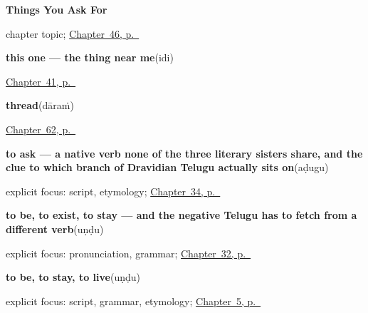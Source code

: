 \noindent\begin{minipage}[t]{\linewidth}
\raggedright
\textbf{Things You Ask For}\par
\footnotesize chapter topic; \hyperref[ch:te-ask-for]{Chapter~46, p.~\pageref*{ch:te-ask-for}}
\end{minipage}\par\smallskip

\noindent\begin{minipage}[t]{\linewidth}
\raggedright
\textbf{this one — the thing near me}\enspace\emph{}\enspace(idi)\par
\footnotesize \hyperref[ch:te-pointing-and-asking]{Chapter~41, p.~\pageref*{ch:te-pointing-and-asking}}
\end{minipage}\par\smallskip

\noindent\begin{minipage}[t]{\linewidth}
\raggedright
\textbf{thread}\enspace\emph{}\enspace(dāraṁ)\par
\footnotesize \hyperref[ch:te-made-things]{Chapter~62, p.~\pageref*{ch:te-made-things}}
\end{minipage}\par\smallskip

\noindent\begin{minipage}[t]{\linewidth}
\raggedright
\textbf{to ask — a native verb none of the three literary sisters share, and the clue to which branch of Dravidian Telugu actually sits on}\enspace\emph{}\enspace(aḍugu)\par
\footnotesize explicit focus: script, etymology; \hyperref[ch:te-verbs-between-people]{Chapter~34, p.~\pageref*{ch:te-verbs-between-people}}
\end{minipage}\par\smallskip

\noindent\begin{minipage}[t]{\linewidth}
\raggedright
\textbf{to be, to exist, to stay — and the negative Telugu has to fetch from a different verb}\enspace\emph{}\enspace(uṇḍu)\par
\footnotesize explicit focus: pronunciation, grammar; \hyperref[ch:te-core-verbs]{Chapter~32, p.~\pageref*{ch:te-core-verbs}}
\end{minipage}\par\smallskip

\noindent\begin{minipage}[t]{\linewidth}
\raggedright
\textbf{to be, to stay, to live}\enspace\emph{}\enspace(uṇḍu)\par
\footnotesize explicit focus: script, grammar, etymology; \hyperref[ch:first-verbs]{Chapter~5, p.~\pageref*{ch:first-verbs}}
\end{minipage}\par\smallskip

